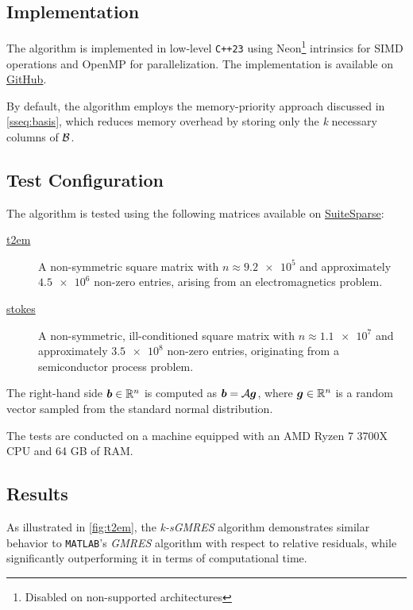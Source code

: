 \subsection{Implementation}

The algorithm is implemented in low-level \lstinline{C++23} using Neon\footnote{Disabled on non-supported architectures} intrinsics for SIMD operations and OpenMP for parallelization. The implementation is available on \href{https://github.com/diantonioandrea/NASS}{GitHub}.

By default, the algorithm employs the memory-priority approach discussed in \cref{sseq:basis}, which reduces memory overhead by storing only the \textit{k} necessary columns of $\mathcal{B}$.

\subsection{Test Configuration}

The algorithm is tested using the following matrices available on \href{https://sparse.tamu.edu}{SuiteSparse}:

\begin{description}
    \item[\href{https://sparse.tamu.edu/CEMW/t2em}{t2em}] A non-symmetric square matrix with $n \approx \num{9.2e5}$ and approximately $\num{4.5e6}$ non-zero entries, arising from an electromagnetics problem.
    \item[\href{https://sparse.tamu.edu/VLSI/stokes}{stokes}] A non-symmetric, ill-conditioned square matrix with $n \approx \num{1.1e7}$ and approximately $\num{3.5e8}$ non-zero entries, originating from a semiconductor process problem.
\end{description}

The right-hand side $\bm{b} \in \mathbb{R}^{n}$ is computed as $\bm{b} = \mathcal{A} \bm{g}$, where $\bm{g} \in \mathbb{R}^{n}$ is a random vector sampled from the standard normal distribution.

The tests are conducted on a machine equipped with an AMD Ryzen 7 3700X CPU and 64 GB of RAM.

\newpage
\subsection{Results}

As illustrated in \cref{fig:t2em}, the \textit{k-sGMRES} algorithm demonstrates similar behavior to \lstinline{MATLAB}'s \textit{GMRES} algorithm with respect to relative residuals, while significantly outperforming it in terms of computational time.

